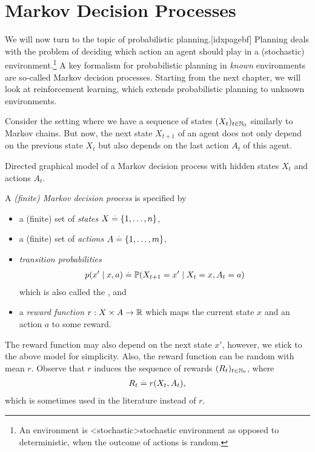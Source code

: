 \chapter{Markov Decision Processes}\label{sec:mdp}

We will now turn to the topic of probabilistic planning.[idxpagebf]
Planning deals with the problem of deciding which action an agent should play in a (stochastic) environment.\footnote{An environment is \idx<stochastic>{stochastic environment} as opposed to deterministic, when the outcome of actions is random.}
A key formalism for probabilistic planning in \emph{known} environments are so-called Markov decision processes.
Starting from the next chapter, we will look at reinforcement learning, which extends probabilistic planning to unknown environments.

Consider the setting where we have a sequence of states $(X_t)_{t\in\mathbb{N}_0}$ similarly to Markov chains.
But now, the next state $X_{t+1}$ of an agent does not only depend on the previous state $X_t$ but also depends on the last action $A_t$ of this agent.

\begin{marginfigure}
  \caption{Directed graphical model of a Markov decision process with hidden states $X_t$ and actions $A_t$.}
\end{marginfigure}

\begin{defn}
  A \emph{(finite) Markov decision process} is specified by \begin{itemize}
    \item a (finite) set of \emph{states} $X \overset{.}{=} \{1, \dots, n\}$,
    \item a (finite) set of \emph{actions} $A \overset{.}{=} \{1, \dots, m\}$,
    \item \emph{transition probabilities} \begin{align}
      p(x' \mid x, a) \defeq \Pr{X_{t+1} = x' \mid X_t = x, A_t = a}
    \end{align} which is also called the , and
    \item a \emph{reward function} $r : X \times A \to \mathbb{R}$ which maps the current state $x$ and an action $a$ to some reward.
  \end{itemize}
\end{defn}

The reward function may also depend on the next state $x'$, however, we stick to the above model for simplicity.
Also, the reward function can be random with mean $r$.
Observe that $r$ induces the sequence of rewards $(R_t)_{t\in\mathbb{N}_0}$, where \begin{align}
  R_t \overset{.}{=} r(X_t, A_t),
\end{align} which is sometimes used in the literature instead of $r$.


